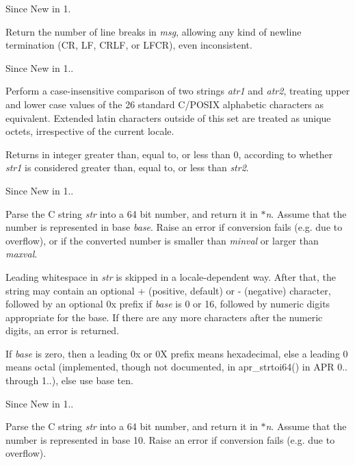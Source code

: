 \begin{DoxySince}{Since}
New in 1.
\end{DoxySince}
Return the number of line breaks in {\itshape msg}, allowing any kind of newline termination (CR, LF, C\+R\+LF, or L\+F\+CR), even inconsistent.

\begin{DoxySince}{Since}
New in 1..
\end{DoxySince}
Perform a case-\/insensitive comparison of two strings {\itshape atr1} and {\itshape atr2}, treating upper and lower case values of the 26 standard C/\+P\+O\+S\+IX alphabetic characters as equivalent. Extended latin characters outside of this set are treated as unique octets, irrespective of the current locale.

Returns in integer greater than, equal to, or less than 0, according to whether {\itshape str1} is considered greater than, equal to, or less than {\itshape str2}.

\begin{DoxySince}{Since}
New in 1..
\end{DoxySince}
Parse the C string {\itshape str} into a 64 bit number, and return it in {\itshape $\ast$n}. Assume that the number is represented in base {\itshape base}. Raise an error if conversion fails (e.\+g. due to overflow), or if the converted number is smaller than {\itshape minval} or larger than {\itshape maxval}.

Leading whitespace in {\itshape str} is skipped in a locale-\/dependent way. After that, the string may contain an optional \textquotesingle{}+\textquotesingle{} (positive, default) or \textquotesingle{}-\/\textquotesingle{} (negative) character, followed by an optional \textquotesingle{}0x\textquotesingle{} prefix if {\itshape base} is 0 or 16, followed by numeric digits appropriate for the base. If there are any more characters after the numeric digits, an error is returned.

If {\itshape base} is zero, then a leading \textquotesingle{}0x\textquotesingle{} or \textquotesingle{}0X\textquotesingle{} prefix means hexadecimal, else a leading \textquotesingle{}0\textquotesingle{} means octal (implemented, though not documented, in apr\+\_\+strtoi64() in A\+PR 0.. through 1..), else use base ten.

\begin{DoxySince}{Since}
New in 1..
\end{DoxySince}
Parse the C string {\itshape str} into a 64 bit number, and return it in {\itshape $\ast$n}. Assume that the number is represented in base 10. Raise an error if conversion fails (e.\+g. due to overflow).

